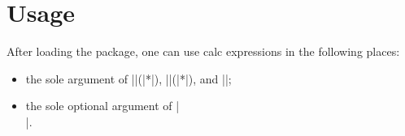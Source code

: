\documentclass[a4paper]{article}
\newcommand{\Pkg}[1]{\textsf{#1}}
\begin{document}
\section{Usage}

After loading the package, one can use \Pkg{calc} expressions
in the following places:
\begin{itemize}
\item the sole argument of |\hspace|(|*|), |\vspace|(|*|), 
and |\addvspace|;
\item the sole optional argument of |\\|.
\end{itemize}

\end{document}
